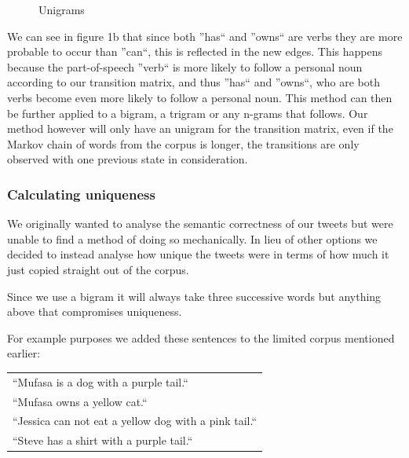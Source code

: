 \documentclass[a4paper,12pt]{article}
\begin{document}
\begin{figure}[h!]
  \hfill
  \hfill
  \hfill
  \caption{Unigrams}
 \end{figure}



We can see in figure 1b that since both ''has`` and ''owns`` are verbs they are more probable to occur than ''can``, this is reflected in the new edges. 
This happens because the part-of-speech ''verb`` is more likely to follow a personal noun according to our transition matrix, and thus ''has`` and ''owns``, who are 
both verbs become even more likely to follow a personal noun. This method can then be further applied to a bigram, a trigram or any n-grams that follows. 
Our method however will only have an unigram for the transition matrix, even if the Markov chain of words from the corpus is longer, 
the transitions are only observed with one previous state in consideration.

\subsubsection{Calculating uniqueness}
We originally wanted to analyse the semantic correctness of our tweets but were unable to find a method of doing so mechanically. In lieu of other options we decided to instead analyse how unique the tweets were in terms of how much it just copied straight out of the corpus.

Since we use a bigram it will always take three successive words but anything above that compromises uniqueness.

For example purposes we added these sentences to the limited corpus mentioned earlier:

\begin{tabular}{l}
``Mufasa is a dog with a purple tail.``\\
``Mufasa owns a yellow cat.``\\
``Jessica can not eat a yellow dog with a pink tail.``\\
``Steve has a shirt with a purple tail.``\\
\end{tabular}
\end{document}
